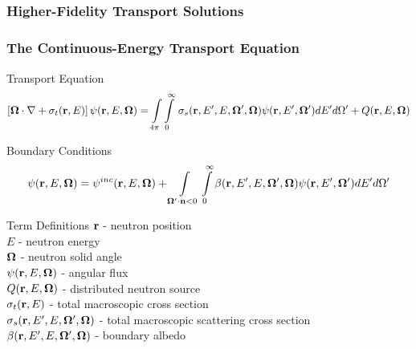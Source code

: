 \documentclass[compress,10pt]{beamer}
\renewcommand{\vec}[1]{\mathbf{#1}}
\begin{document}
\subsection{}
\begin{frame}[t]\frametitle{Higher-Fidelity Transport Solutions}

\end{frame}
\begin{frame}[t]\frametitle{The Continuous-Energy Transport Equation} \vspace{-2.5mm}
\begin{block}{Transport Equation}{\footnotesize
\begin{equation*}
\left[ { \bf \Omega} \cdot {\bf \nabla}  + \sigma_t ({\bf r}, E) \right] \psi ({\bf r}, E, {\bf \Omega}) = \int\displaylimits_{4 \pi} \int\displaylimits_{0}^{\infty}  \, \sigma_s ({\bf r}, E' , E, {\bf \Omega}' , {\bf \Omega}) \psi ({\bf r}, E', {\bf \Omega}') d E'  d \Omega'+ Q ({\bf r}, E, {\bf \Omega})
\end{equation*}
}\end{block} \vspace{-1.0mm}
\begin{block}{Boundary Conditions}{\footnotesize
\begin{equation*}
\psi ({\bf r}, E, {\bf \Omega}) = \psi^{inc} ({\bf r}, E, {\bf \Omega}) +  \int\displaylimits_{\vec{\Omega}' \cdot \vec{n} < 0} \int\displaylimits_{0}^{\infty} \beta ({\bf r}, E' , E, {\bf \Omega}' , {\bf \Omega}) \psi ({\bf r}, E', {\bf \Omega}') d E'  d \Omega'
\end{equation*}
}\end{block} \vspace{-1.0mm}
\begin{block}{Term Definitions} {\footnotesize
${\bf r}$ -  neutron position \\
$E$ -  neutron energy \\
${\bf \Omega}$ - neutron solid angle \\
$\psi  ({\bf r}, E, {\bf \Omega})$ - angular flux  \\
$Q  ({\bf r}, E, {\bf \Omega})$ - distributed neutron source \\
$\sigma_t ({\bf r}, E)$ - total macroscopic cross section \\
$\sigma_s ({\bf r}, E' , E, {\bf \Omega}' , {\bf \Omega})$ - total macroscopic scattering cross section\\
$\beta ({\bf r}, E' , E, {\bf \Omega}' , {\bf \Omega})$ - boundary albedo 
}\end{block}
\end{frame}
\end{document}
